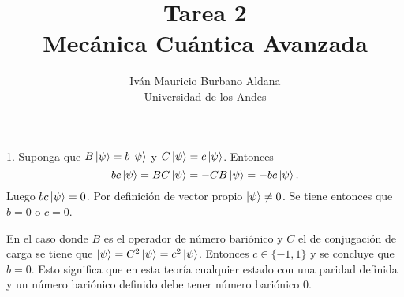\documentclass{article}
\author{Iván Mauricio Burbano Aldana\\Universidad de los Andes}
\title{Tarea 2\\Mecánica Cuántica Avanzada}
\begin{document}
\maketitle

1. Suponga que $B\ket{\psi}=b\ket{\psi}$ y $C\ket{\psi}=c\ket{\psi}$. Entonces
\begin{equation}
bc\ket{\psi}=BC\ket{\psi}=-CB\ket{\psi}=-bc\ket{\psi}.
\end{equation}
Luego $bc\ket{\psi}=0$. Por definición de vector propio $\ket{\psi}\neq 0$. Se tiene entonces que $b=0$ o $c=0$.

En el caso donde $B$ es el operador de número bariónico y $C$ el de conjugación de carga se tiene que $\ket{\psi}=C^2\ket{\psi}=c^2\ket{\psi}$. Entonces $c\in\{-1,1\}$ y se concluye que $b=0$. Esto significa que en esta teoría cualquier estado con una paridad definida y un número bariónico definido debe tener número bariónico 0.
\end{document}
